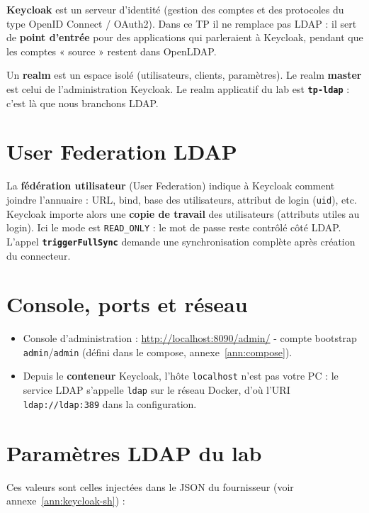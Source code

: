 \documentclass[11pt,a4paper]{report}
\begin{document}
\textbf{Keycloak} est un serveur d'identité (gestion des comptes et des protocoles du type OpenID Connect / OAuth2). Dans ce TP il ne remplace pas LDAP : il sert de \textbf{point d'entrée} pour des applications qui parleraient à Keycloak, pendant que les comptes « source » restent dans OpenLDAP.

Un \textbf{realm} est un espace isolé (utilisateurs, clients, paramètres). Le realm \textbf{master} est celui de l'administration Keycloak. Le realm applicatif du lab est \textbf{\texttt{tp-ldap}} : c'est là que nous branchons LDAP.

\section{User Federation LDAP}

La \textbf{fédération utilisateur} (User Federation) indique à Keycloak comment joindre l'annuaire : URL, bind, base des utilisateurs, attribut de login (\texttt{uid}), etc. Keycloak importe alors une \textbf{copie de travail} des utilisateurs (attributs utiles au login). Ici le mode est \texttt{READ\_ONLY} : le mot de passe reste contrôlé côté LDAP. L'appel \textbf{\texttt{triggerFullSync}} demande une synchronisation complète après création du connecteur.

\section{Console, ports et réseau}

\begin{itemize}[leftmargin=*]
  \item Console d'administration : \url{http://localhost:8090/admin/} - compte bootstrap \texttt{admin}/\texttt{admin} (défini dans le compose, annexe~\ref{ann:compose}).
  \item Depuis le \textbf{conteneur} Keycloak, l'hôte \texttt{localhost} n'est pas votre PC : le service LDAP s'appelle \texttt{ldap} sur le réseau Docker, d'où l'URI \texttt{ldap://ldap:389} dans la configuration.
\end{itemize}

\section{Paramètres LDAP du lab}

Ces valeurs sont celles injectées dans le JSON du fournisseur (voir annexe~\ref{ann:keycloak-sh}) :
\end{document}
